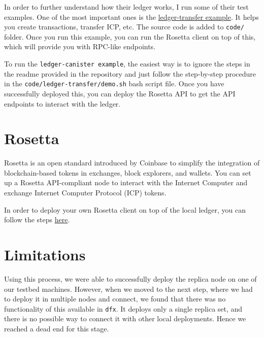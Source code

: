In order to further understand how their ledger works, I run some of their test examples. One of the most important ones is the \href{https://github.com/dfinity/examples/tree/master/motoko/ledger-transfer}{ledger-transfer example}. It helps you create transactions, transfer ICP, etc. The source code is added to \texttt{code/} folder. Once you run this example, you can run the Rosetta client on top of this, which will provide you with RPC-like endpoints.

To run the \texttt{ledger-canister example}, the easiest way is to ignore the steps in the readme provided in the repository and just follow the step-by-step procedure in the \texttt{code/ledger-transfer/demo.sh} bash script file. Once you have successfully deployed this, you can deploy the Rosetta API to get the API endpoints to interact with the ledger.

\section{Rosetta}

Rosetta is an open standard introduced by Coinbase to simplify the integration of blockchain-based tokens in exchanges, block explorers, and wallets. You can set up a Rosetta API-compliant node to interact with the Internet Computer and exchange Internet Computer Protocol (ICP) tokens.

In order to deploy your own Rosetta client on top of the local ledger, you can follow the steps \href{https://internetcomputer.org/docs/current/developer-docs/integrations/rosetta/}{here}.

\section{Limitations}

Using this process, we were able to successfully deploy the replica node on one of our testbed machines. However, when we moved to the next step, where we had to deploy it in multiple nodes and connect, we found that there was no functionality of this available in \texttt{dfx}. It deploys only a single replica set, and there is no possible way to connect it with other local deployments. Hence we reached a dead end for this stage.
